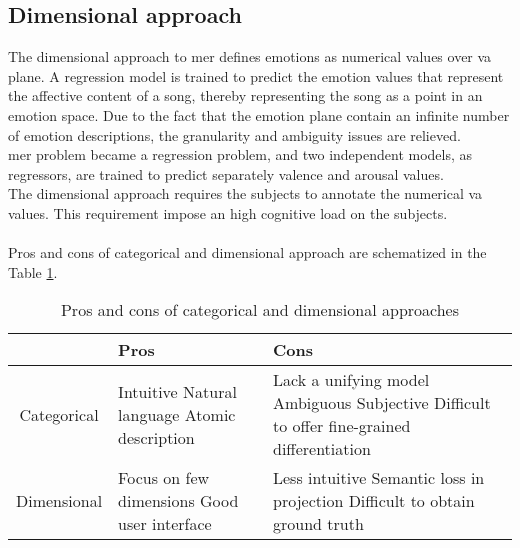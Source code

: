 \subsection{Dimensional approach}
The dimensional approach to \gls{mer} defines emotions as numerical values over \gls{va} plane. A regression model is trained to predict the emotion values that represent the affective content of a song, thereby representing the song as a point in an emotion space. Due to the fact that the emotion plane contain an infinite number of emotion descriptions, the granularity and ambiguity issues are relieved.
\\
\gls{mer} problem became a regression problem, and two independent models, as regressors, are trained to predict separately valence and arousal values.
\\
The dimensional approach requires the subjects to annotate the numerical \gls{va} values. This requirement impose an high cognitive load on the subjects.
\\ \\
Pros and cons of categorical and dimensional approach are schematized in the Table \ref{table:pros_cons_categorical_dimensional}.
\begin{table}[h!]
	\centering
	\begin{tabular}{|c|p{}|p{}|}
	\hline
	& Pros & Cons\\ [0.5ex] 
	\hline\hline Categorical & Intuitive \newline Natural language \newline Atomic description & Lack a unifying model \newline Ambiguous \newline Subjective \newline Difficult to offer fine-grained differentiation \\
	\hline Dimensional & Focus on few dimensions \newline Good user interface & Less intuitive \newline Semantic loss in projection \newline Difficult to obtain ground truth \\
	\hline
	\end{tabular}
	\caption{Pros and cons of categorical and dimensional approaches}
	\label{table:pros_cons_categorical_dimensional}
\end{table}

\newpage
